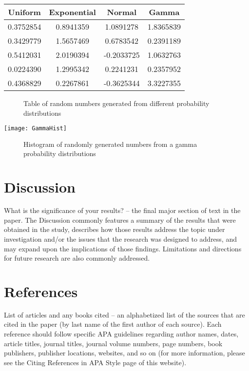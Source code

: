 \documentclass[12pt, letterpaper, twoside]{article}\usepackage[]{graphicx}\usepackage[]{xcolor}
\begin{document}
\begin{center}
\begin{tabular}{||c c c c||}
 \hline
 Uniform & Exponential & Normal & Gamma \\ [0.5ex]
 \hline\hline
 0.3752854 & 0.8941359 & 1.0891278 & 1.8365839 \\
 \hline
 0.3429779 & 1.5657469 & 0.6783542 & 0.2391189 \\
 \hline
 0.5412031 & 2.0190394 & -0.2033725 & 1.0632763 \\
 \hline
 0.0224390 & 1.2995342 & 0.2241231 & 0.2357952 \\
 \hline
 0.4368829 & 0.2267861 & -0.3625344 & 3.3227355 \\ [1ex]
 \hline
\end{tabular}
\end{center}

\begin{figure}[h]
  \centering
  \caption{Table of random numbers generated from different probability distributions}
  \label{fig:Random Variable Table}
\end{figure}

\texttt{[image: GammaHist]}

\begin{figure}[h]
  \centering
  \caption{Histogram of randomly generated numbers from a gamma probability distributions}
  \label{fig:Random Gamma Histogram}
\end{figure}

\section*{Discussion}
What is the significance of your results? – the final major section of
text in the paper.  The Discussion commonly features a summary of the
results that were obtained in the study, describes how those results
address the topic under investigation and/or the issues that the research
was designed to address, and may expand upon the implications of those
findings.  Limitations and directions for future research are also commonly
addressed.

\newpage

\section*{References}
List of articles and any books cited – an alphabetized list of the
sources that are cited in the paper (by last name of the first author of
each source).  Each reference should follow specific APA guidelines
regarding author names, dates, article titles, journal titles, journal
volume numbers, page numbers, book publishers, publisher locations,
websites, and so on (for more information, please see the Citing References
in APA Style page of this website).
\end{document}
